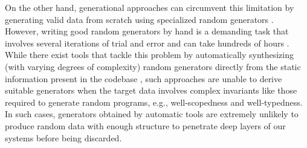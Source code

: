 \documentclass[10pt,conference]{IEEEtran}
\begin{document}
%
On the other hand, generational approaches can circumvent this limitation by
generating valid data from scratch using specialized random generators
\cite{eddington2011peach, dharma, grieco2016quickfuzz, grieco2017quickfuzz}.
%
However, writing good random generators by hand is a demanding task that
involves several iterations of trial and error and can take hundreds of hours
\cite{lampropoulos2019coverage}.
%
While there exist tools that tackle this problem by automatically synthesizing
(with varying degrees of complexity) random generators directly from the static
information present in the codebase \cite{mista2018branching,
  mista2019generating, duregaard2012feat, lampropoulos2017generating}, such
approaches are unable to derive suitable generators when the target data
involves complex invariants like those required to generate random programs,
e.g., well-scopedness and well-typedness.
%
In such cases, generators obtained by automatic tools are extremely unlikely to
produce random data with enough structure to penetrate deep layers of our
systems before being discarded.
%



\end{document}
